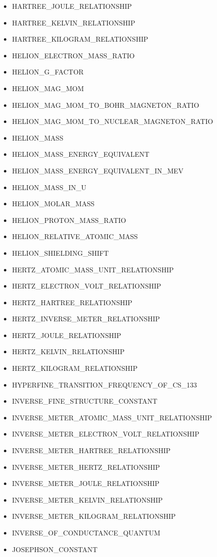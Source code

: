 \begin{itemize}
\item HARTREE\_JOULE\_RELATIONSHIP
\item HARTREE\_KELVIN\_RELATIONSHIP
\item HARTREE\_KILOGRAM\_RELATIONSHIP
\item HELION\_ELECTRON\_MASS\_RATIO
\item HELION\_G\_FACTOR
\item HELION\_MAG\_MOM
\item HELION\_MAG\_MOM\_TO\_BOHR\_MAGNETON\_RATIO
\item HELION\_MAG\_MOM\_TO\_NUCLEAR\_MAGNETON\_RATIO
\item HELION\_MASS
\item HELION\_MASS\_ENERGY\_EQUIVALENT
\item HELION\_MASS\_ENERGY\_EQUIVALENT\_IN\_MEV
\item HELION\_MASS\_IN\_U
\item HELION\_MOLAR\_MASS
\item HELION\_PROTON\_MASS\_RATIO
\item HELION\_RELATIVE\_ATOMIC\_MASS
\item HELION\_SHIELDING\_SHIFT
\item HERTZ\_ATOMIC\_MASS\_UNIT\_RELATIONSHIP
\item HERTZ\_ELECTRON\_VOLT\_RELATIONSHIP
\item HERTZ\_HARTREE\_RELATIONSHIP
\item HERTZ\_INVERSE\_METER\_RELATIONSHIP
\item HERTZ\_JOULE\_RELATIONSHIP
\item HERTZ\_KELVIN\_RELATIONSHIP
\item HERTZ\_KILOGRAM\_RELATIONSHIP
\item HYPERFINE\_TRANSITION\_FREQUENCY\_OF\_CS\_133
\item INVERSE\_FINE\_STRUCTURE\_CONSTANT
\item INVERSE\_METER\_ATOMIC\_MASS\_UNIT\_RELATIONSHIP
\item INVERSE\_METER\_ELECTRON\_VOLT\_RELATIONSHIP
\item INVERSE\_METER\_HARTREE\_RELATIONSHIP
\item INVERSE\_METER\_HERTZ\_RELATIONSHIP
\item INVERSE\_METER\_JOULE\_RELATIONSHIP
\item INVERSE\_METER\_KELVIN\_RELATIONSHIP
\item INVERSE\_METER\_KILOGRAM\_RELATIONSHIP
\item INVERSE\_OF\_CONDUCTANCE\_QUANTUM
\item JOSEPHSON\_CONSTANT

\end{itemize}
